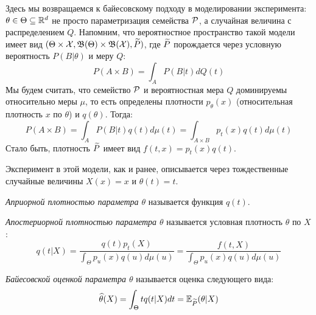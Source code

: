 \begin{note}
	Здесь мы возвращаемся к байесовскому подходу в моделировании эксперимента: $\theta \in \Theta \subseteq \mathbb{R}^d$ не просто параметризация семейства $\mathcal{P}$, а случайная величина с распределением $Q$. Напомним, что вероятностное пространство такой модели имеет вид $(\Theta \times \mathcal{X}, \mathfrak{B}(\Theta) \times \mathfrak{B}(\mathcal{X}), \widetilde{P})$, где $\widetilde{P}$ порождается через условную вероятность $P(B|\theta)$ и меру $Q$:
	\[
		P(A \times B) = \int_A P(B|t)dQ(t)
	\]
	Мы будем считать, что семейство $\mathcal{P}$ и вероятностная мера $Q$ доминируемы относительно меры $\mu$, то есть определены плотности $p_\theta(x)$ (относительная плотность $x$ по $\theta$) и $q(\theta)$. Тогда:
	\[
		P(A \times B) = \int_A P(B|t)q(t)d\mu(t) = \int_{A \times B} p_t(x)q(t)d\mu(t)
	\]
	Стало быть, плотность $\widetilde{P}$ имеет вид $f(t, x) = p_t(x)q(t)$.
	
	Эксперимент в этой модели, как и ранее, описывается через тождественные случайные величины $X(x) = x$ и $\theta(t) = t$.
\end{note}

\begin{definition}
	\textit{Априорной плотностью параметра $\theta$} называется функция $q(t)$.
\end{definition}

\begin{definition}
	\textit{Апостериорной плотностью параметра $\theta$} называется условная плотность $\theta$ по $X$:
	\[
		q(t|X) = \frac{q(t)p_t(X)}{\int_\Theta p_u(x)q(u)d\mu(u)} = \frac{f(t, X)}{\int_\Theta p_u(x)q(u)d\mu(u)}
	\]
\end{definition}

\begin{definition}
	\textit{Байесовской оценкой параметра $\theta$} называется оценка следующего вида:
	\[
		\widehat{\theta}(X) = \int_\Theta tq(t|X)dt = \mathbb{E}_{\widetilde{P}}(\theta|X)
	\]
\end{definition}